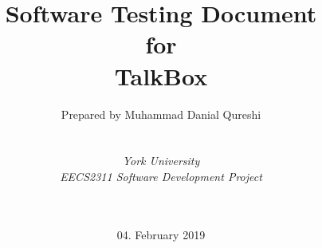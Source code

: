 
\def\Company{Consultancy}
\def\Institute{\textit{York University}}
\def\Course{\textit{EECS2311 Software Development Project}}

\def\BoldTitle{Software Testing Document}

\def\Subtitle{for \\ TalkBox\\}
 \def\Authors{Prepared by Muhammad Danial Qureshi } 
\def\Shortname{M.Qureshi}


\title{\textbf{\BoldTitle}\\\Subtitle}
\author{\Authors \\ \\ \\ \Institute\\ \Course\\ \Module\\ \Docent\\ \Assistant}
\date{04. February 2019}

